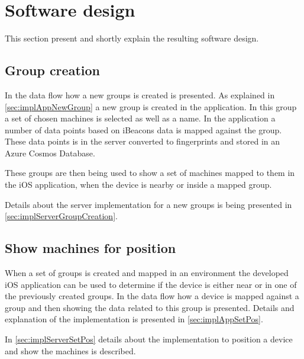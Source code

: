 \section{Software design}\label{sec:resultSoftwareDesign}
This section present and shortly explain the resulting software design.


\subsection{Group creation}\label{sec:resultsSoftwareDesignGroup}

In  the data flow how a new groups is created is presented.
As explained in \cref{sec:implAppNewGroup} a new group is created in the application.
In this group a set of chosen machines is selected as well as a name.
In the application a number of data points based on iBeacons data is mapped against the group.
These data points is in the server converted to fingerprints and stored in an Azure Cosmos Database.

\bigskip

These groups are then being used to show a set of machines mapped to them in the iOS application, when the device is nearby or inside a mapped group.

\bigskip

Details about the server implementation for a new groups is being presented in \cref{sec:implServerGroupCreation}.


\subsection{Show machines for position}\label{sec:resultsSoftwareDesignPos}

When a set of groups is created and mapped in an environment the developed iOS application can be used to determine if the device is either near or in one of the previously created groups.
In  the data flow how a device is mapped against a group and then showing the data related to this group is presented.
Details and explanation of the implementation is presented in \cref{sec:implAppSetPos}.

\bigskip

In \cref{sec:implServerSetPos} details about the implementation to position a device and show the machines is described.

